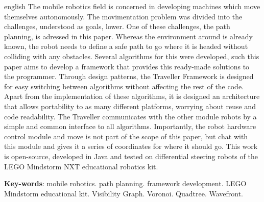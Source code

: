 \begin{resumo}[Abstract]
 \begin{otherlanguage*}{english}
   The mobile robotics field is concerned in developing machines which move themselves autonomously. The movimentation problem was divided into the challenges, understood as goals, lower. One of these challenges, the path planning, is adressed in this paper. Whereas  the environment around is already known, the robot needs to define a safe path to go where it is headed without colliding with any obstacles. Several algorithms for this were developed, such this paper aims to develop a framework that provides this ready-made solutions to the programmer. Through design patterns, the Traveller Framework is designed for easy switching between algorithms without affecting the rest of the code. Apart from the implementation of these algorithms, it is designed an architecture that allows portability to as many different platforms, worrying about reuse and code readability. The Traveller communicates with the other module robots by a simple and common interface to all algorithms. Importantly, the robot hardware control module and move is not part of the scope of this paper, but chat with this module and gives it a series of coordinates for where it should go. This work is open-source, developed in Java and tested on differential steering robots of  the LEGO Mindstorm NXT educational robotics kit.

   \vspace{\onelineskip}
 
   \noindent 
   \textbf{Key-words}: mobile robotics. path planning. framework development. LEGO Mindstorm educational kit. Visibility Graph. Voronoi. Quadtree. Wavefront.
 \end{otherlanguage*}
\end{resumo}

